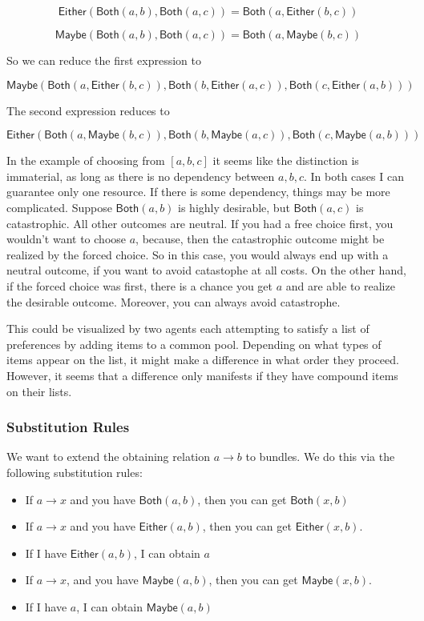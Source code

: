 \documentclass[12pt]{article}
\theoremstyle{definition}
\theoremstyle{plain}
\theoremstyle{plain}
\theoremstyle{plain}
\theoremstyle{plain}
\theoremstyle{remark}
\theoremstyle{remark}
\begin{document}
\[\mathsf{Either}(\mathsf{Both}(a,b), \mathsf{Both}(a,c)) 
= \mathsf{Both}(a,\mathsf{Either}(b,c))
\]

\[ \mathsf{Maybe}(\mathsf{Both}(a,b), \mathsf{Both}(a,c)) 
= \mathsf{Both}(a,\mathsf{Maybe}(b,c)) \]

So we can reduce the first expression to

\[
\mathsf{Maybe}( \mathsf{Both}(a,\mathsf{Either}(b,c)), \mathsf{Both}(b,\mathsf{Either}(a,c)), \mathsf{Both}(c,\mathsf{Either}(a,b)))
\]

The second expression reduces to

\[
\mathsf{Either}( \mathsf{Both}(a,\mathsf{Maybe}(b,c)), \mathsf{Both}(b,\mathsf{Maybe}(a,c)), \mathsf{Both}(c,\mathsf{Maybe}(a,b)))
\]

In the example of choosing from $[a,b,c]$ it seems like the distinction is immaterial, as long as there is no dependency between $a,b,c$. In both cases I can guarantee only one resource. If there is some dependency, things may be more complicated. Suppose $\mathsf{Both}(a,b)$ is highly desirable, but $\mathsf{Both}(a,c)$ is catastrophic. All other outcomes are neutral. If you had a free choice first, you wouldn't want to choose $a$, because, then the catastrophic outcome might be realized by the forced choice. So in this case, you would always end up with a neutral outcome, if you want to avoid catastophe at all costs. On the other hand, if the forced choice was first, there is a chance you get $a$ and are able to realize the desirable outcome. Moreover, you can always avoid catastrophe.   

This could be visualized by two agents each attempting to satisfy a list of preferences by adding items to a common pool. Depending on what types of items appear on the list, it might make a difference in what order they proceed. However, it seems that a difference only manifests if they have compound items on their lists. 

\subsubsection{Substitution Rules}
We want to extend the obtaining relation $a \rightarrow b$ to bundles. We do this via the following substitution rules:
\begin{itemize}
	\item If $a \rightarrow x$ and you have $\mathsf{Both}(a,b)$, then you can get $\mathsf{Both}(x,b)$
	\item If $a \rightarrow x$ and you have $\mathsf{Either}(a,b)$, then you can get $\mathsf{Either}(x,b)$.
	\item If I have $\mathsf{Either}(a,b)$, I can obtain $a$
	\item If  $a \rightarrow x$, and you have $\mathsf{Maybe}(a,b)$, then you can get $\mathsf{Maybe}(x,b) $.
	\item If I have $a$, I can obtain $\mathsf{Maybe}(a,b)$
\end{itemize}
\end{document}
